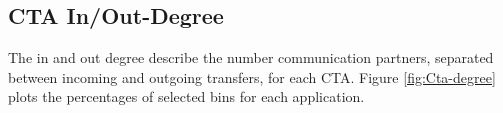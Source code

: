
\subsection{CTA In/Out-Degree}
The in and out degree describe the number  communication partners, separated between incoming and outgoing transfers, for each CTA. Figure \ref{fig:Cta-degree} plots the percentages of selected bins for each application. 

